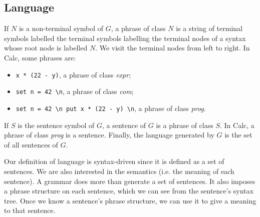 \documentclass[a4paper, openany]{memoir}
\begin{document}
\subsection{Language}
If $N$ is a non-terminal symbol of $G$, a phrase of class $N$ is a string of terminal symbols labelled the terminal symbols labelling the terminal nodes of a syntax whose root node is labelled $N$. We visit the terminal nodes from left to right. In Calc, some phrases are:
\begin{itemize}
    \item \texttt{x * (22 - y)}, a phrase of class \textit{expr};
    \item \texttt{set n = 42 \textbackslash n}, a phrase of class \textit{com};
    \item \texttt{set n = 42 \textbackslash n put x * (22 - y) \textbackslash n}, a phrase of class \textit{prog}.
\end{itemize}
If $S$ is the sentence symbol of $G$, a sentence of $G$ is a phrase of class $S$. In Calc, a phrase of class \textit{prog} is a sentence. Finally, the language generated by $G$ is the set of all sentences of $G$.

Our definition of language is syntax-driven since it is defined as a set of sentences. We are also interested in the semantics (i.e. the meaning of each sentence). A grammar does more than generate a set of sentences. It also imposes a phrase structure on each sentence, which we can see from the sentence's syntax tree. Once we know a sentence's phrase structure, we can use it to give a meaning to that sentence. 
\end{document}
